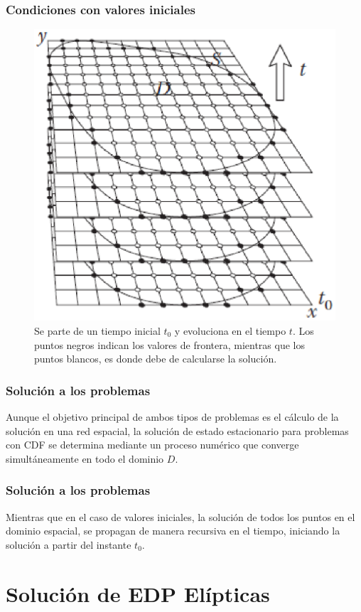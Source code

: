 \documentclass[12pt]{beamer}
\begin{document}
\begin{frame}
\captionsetup{font=scriptsize,labelfont=scriptsize}
\frametitle{Condiciones con valores iniciales}
\begin{figure}
    \centering
    \includegraphics[scale=0.45]{Imagenes/condicionesEDP_02.eps}
    \caption{Se parte de un tiempo inicial $t_{0}$ y evoluciona en el tiempo $t$. Los puntos negros indican los valores de frontera, mientras que los puntos blancos, es donde debe de calcularse la solución.}
\end{figure}
\end{frame}
\begin{frame}
\frametitle{Solución a los problemas}
Aunque el objetivo principal de ambos tipos de problemas es el cálculo de la solución en una red espacial, \pause la solución de estado estacionario para problemas con CDF se determina mediante un proceso numérico que converge simultáneamente en todo el dominio $D$.
\end{frame}
\begin{frame}
\frametitle{Solución a los problemas}
Mientras que en el caso de valores iniciales, la solución de todos los puntos en el dominio espacial, se propagan de manera recursiva en el tiempo, iniciando la solución a partir del instante $t_{0}$.
\end{frame}

\section{Solución de EDP Elípticas}
\end{document}
